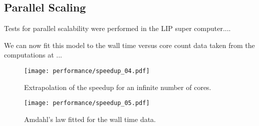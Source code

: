 \subsection{Parallel Scaling}

	Tests for parallel scalability were performed in the LIP super computer.... 
	

	We can now fit this model to the wall time versus core count data taken from the computations at ...


\begin{figure}[h]
	\centering
	\texttt{[image: performance/speedup\_04.pdf]}
	\caption{Extrapolation of the speedup for an infinite number of cores.}
\end{figure}

\begin{figure}[h]
	\centering
	\texttt{[image: performance/speedup\_05.pdf]}
	\caption{Amdahl's law fitted for the wall time data.}
\end{figure}







